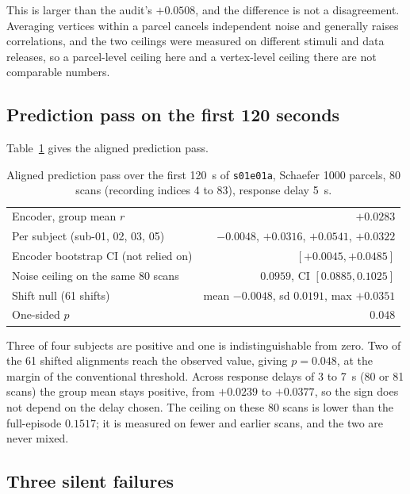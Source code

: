 \documentclass[preprint,12pt]{elsarticle}
\begin{document}
This is larger than the audit's $+0.0508$, and the difference is not a disagreement. Averaging
vertices within a parcel cancels independent noise and generally raises correlations, and the
two ceilings were measured on different stimuli and data releases, so a parcel-level ceiling
here and a vertex-level ceiling there are not comparable numbers.

\subsection{Prediction pass on the first 120 seconds}

Table~\ref{tab:window120} gives the aligned prediction pass.

\begin{table}[htbp]
\centering
\small
\begin{tabular}{@{}lr@{}}
\toprule
Encoder, group mean $r$ & $+0.0283$ \\
Per subject (sub-01, 02, 03, 05) & $-0.0048$, $+0.0316$, $+0.0541$, $+0.0322$ \\
Encoder bootstrap CI (not relied on) & $[+0.0045, +0.0485]$ \\
Noise ceiling on the same 80 scans & $0.0959$, CI $[0.0885, 0.1025]$ \\
Shift null (61 shifts) & mean $-0.0048$, sd $0.0191$, max $+0.0351$ \\
One-sided $p$ & $0.048$ \\
\bottomrule
\end{tabular}
\caption{Aligned prediction pass over the first 120~s of \texttt{s01e01a}, Schaefer 1000
parcels, 80 scans (recording indices 4 to 83), response delay 5~s.}
\label{tab:window120}
\end{table}

Three of four subjects are positive and one is indistinguishable from zero. Two of the 61
shifted alignments reach the observed value, giving $p = 0.048$, at the margin of the
conventional threshold. Across response delays of 3 to 7~s (80 or 81 scans) the group mean
stays positive, from $+0.0239$ to $+0.0377$, so the sign does not depend on the delay chosen.
The ceiling on these 80 scans is lower than the full-episode $0.1517$; it is measured on fewer
and earlier scans, and the two are never mixed.

\subsection{Three silent failures}
\label{sec:failures}
\end{document}
